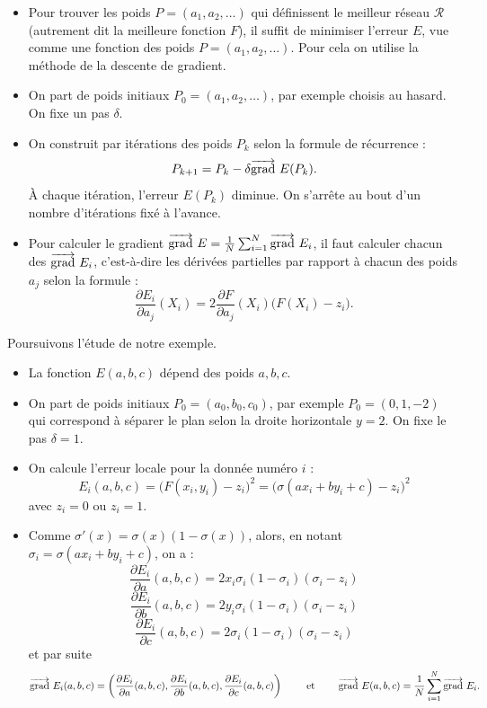 {\begin{itemize}
	\item Pour trouver les poids $P = (a_1,a_2,\ldots)$ qui définissent le meilleur réseau $\mathcal{R}$ (autrement dit la meilleure fonction $F$),
	il suffit de minimiser l'erreur $E$, vue comme une fonction des poids $P = (a_1,a_2,\ldots)$. Pour cela on utilise la méthode de la descente de gradient.
	
	\item On part de poids initiaux $P_0 = (a_1,a_2,\ldots)$, par exemple choisis au hasard. On fixe un pas $\delta$.
	
	\item On construit par itérations des poids $P_k$ selon la formule de récurrence :
	$$P_{k+1} = P_k - \delta \overrightarrow{\textup{grad}}\  E(P_k).$$
	\`A chaque itération, l'erreur $E(P_k)$ diminue.
	On s'arrête au bout d'un nombre d'itérations fixé à l'avance.
	
	\item Pour calculer le gradient $\overrightarrow{\textup{grad}}\  E = \frac 1N \sum_{i=1}^N \overrightarrow{\textup{grad}}\  E_i$, il faut  
	calculer chacun des $\overrightarrow{\textup{grad}}\  E_i$, c'est-à-dire les dérivées partielles par rapport à chacun des poids $a_j$ selon la formule :
	$$\frac{\partial E_i}{\partial a_j}(X_i) = 2 \frac{\partial F}{\partial a_j}(X_i)  \big( F(X_i) - z_i \big).$$
\end{itemize}  


\begin{exemple}{}{}
	Poursuivons l'étude de notre exemple.
	\begin{itemize}
		\item La fonction $E(a,b,c)$ dépend des poids $a,b,c$.
		
		\item On part de poids initiaux $P_0 = (a_0,b_0,c_0)$, par exemple $P_0 = (0,1,-2)$ qui correspond à séparer le plan selon la droite horizontale $y=2$. 
		On fixe le pas $\delta = 1$.
		
		\item On calcule l'erreur locale pour la donnée numéro $i$ :
		$$E_i(a,b,c) = \big( F(x_i,y_i) - z_i \big)^2 = \big( \sigma(ax_i + by_i + c) - z_i \big)^2$$
		avec $z_i = 0$ ou $z_i=1$.
		
		\item Comme $\sigma'(x)= \sigma(x)(1-\sigma(x))$, alors, en notant $\sigma_i = \sigma(ax_i+by_i+c)$, on a :
		$$\frac{\partial E_i}{\partial a}(a,b,c) = 2 x_i  \sigma_i(1-\sigma_i)(\sigma_i - z_i)$$
		$$\frac{\partial E_i}{\partial b}(a,b,c) = 2 y_i \sigma_i(1-\sigma_i)(\sigma_i - z_i)$$
		$$\frac{\partial E_i}{\partial c}(a,b,c) = 2 \sigma_i(1-\sigma_i)(\sigma_i - z_i)$$ 
		et par suite 
		{\small
			$$\overrightarrow{\textup{grad}}\  E_i(a,b,c) = \left(\frac{\partial E_i}{\partial a}(a,b,c), \frac{\partial E_i}{\partial b}(a,b,c), \frac{\partial E_i}{\partial c}(a,b,c) \right)
			\qquad \text{ et  } \qquad 
			\overrightarrow{\textup{grad}}\  E(a,b,c) = \frac 1N \sum_{i=1}^N \overrightarrow{\textup{grad}}\  E_i.$$
		}
		

\end{itemize}
\end{exemple}}
